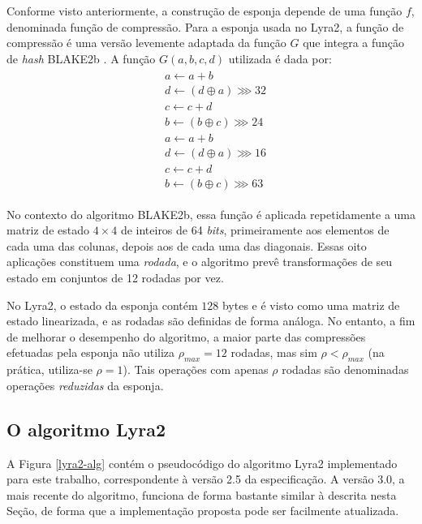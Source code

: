 \documentclass{article}
\begin{document}
Conforme visto anteriormente, a construção de esponja depende de uma
função $f$, denominada função de compressão. Para a esponja usada no
Lyra2, a função de compressão é uma versão levemente adaptada da função
$G$ que integra a função de \emph{hash} BLAKE2b \cite{blake2b} . A função
$G(a, b, c, d)$ utilizada é dada por:
\begin{align*}
\begin{split}
& a \leftarrow a + b \\
& d \leftarrow \left(d \oplus a \right) \ggg 32 \\
& c \leftarrow c + d \\
& b \leftarrow \left(b \oplus c \right) \ggg 24 \\
& a \leftarrow a + b \\
& d \leftarrow \left(d \oplus a \right) \ggg 16 \\
& c \leftarrow c + d \\
& b \leftarrow \left(b \oplus c \right) \ggg 63
\end{split}
\end{align*}

No contexto do algoritmo BLAKE2b, essa função é aplicada repetidamente a
uma matriz de estado $4 \times 4$ de inteiros de 64 \emph{bits},
primeiramente aos elementos de cada uma das colunas, depois aos de cada
uma das diagonais. Essas oito aplicações constituem uma \emph{rodada}, e
o algoritmo prevê transformações de seu estado em conjuntos de 12
rodadas por vez.

No Lyra2, o estado da esponja contém $128$ bytes e é visto como uma
matriz de estado linearizada, e as rodadas são definidas de forma
análoga. No entanto, a fim de melhorar o desempenho do algoritmo, a
maior parte das compressões efetuadas pela esponja não utiliza
$\rho_{max} = 12$ rodadas, mas sim $\rho < \rho_{max}$ (na prática,
utiliza-se $\rho = 1$). Tais operações com apenas $\rho$ rodadas são
denominadas operações \emph{reduzidas} da esponja.

\subsection{O algoritmo Lyra2 }\label{sec-lyra2-alg}

A Figura \ref{lyra2-alg} contém o pseudocódigo do algoritmo Lyra2 implementado
para este trabalho, correspondente à versão 2.5 da especificação. A versão 3.0,
a mais recente do algoritmo, funciona de forma bastante similar à descrita
nesta Seção, de forma que a implementação proposta pode ser facilmente
atualizada.
\end{document}

